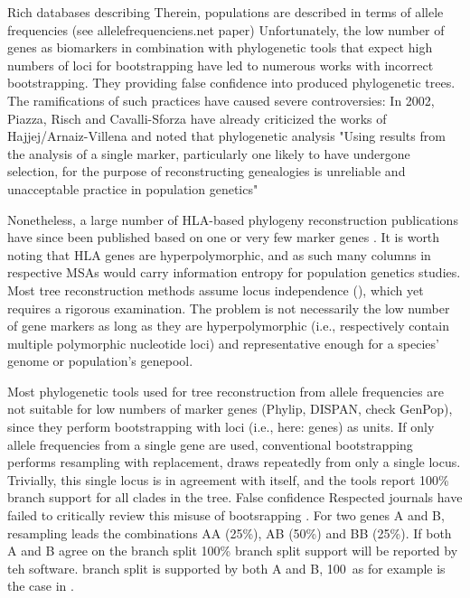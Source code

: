\documentclass{article}
\begin{document}
Rich databases describing
Therein, populations are described in terms of allele frequencies (see allelefrequenciens.net paper)
Unfortunately, the low number of genes as biomarkers in combination with phylogenetic tools that expect high numbers of
loci for bootstrapping have led to numerous works with incorrect bootstrapping.
They providing false confidence into produced phylogenetic trees. The ramifications of such practices have caused
severe controversies:
In 2002, Piazza, Risch and Cavalli-Sforza have already criticized the works of Hajjej/Arnaiz-Villena and noted that
phylogenetic analysis  "Using results from the analysis of a single marker, particularly one likely to
have undergone selection, for the purpose of reconstructing genealogies is unreliable and unacceptable
practice in population genetics"

Nonetheless, a large number of HLA-based phylogeny reconstruction publications have since been  published based on one
or very few marker genes \cite{}.
It is worth noting that HLA genes are hyperpolymorphic, and as such many columns in respective MSAs would carry
information entropy for population genetics studies. Most tree reconstruction methods assume locus independence
(\cite{Efron1996Nov}), which yet requires a rigorous examination. The problem is not necessarily the low number of
gene markers as long as they are hyperpolymorphic (i.e., respectively contain multiple polymorphic nucleotide loci)
and representative enough for a species' genome or population's genepool.

Most phylogenetic tools used for tree reconstruction from allele frequencies are not suitable for low numbers of marker
genes (Phylip, DISPAN, check GenPop), since they perform bootstrapping with loci (i.e., here: genes) as units.
If only allele frequencies from a single gene are used, conventional bootstrapping performs resampling with replacement,
draws repeatedly from only a single locus. Trivially, this single locus is in agreement with itself, and the tools
report 100\% branch support for all clades in the tree.
False confidence
Respected journals have failed to critically review this misuse of bootsrapping \cite{Villena2017Jan,Hajjej2018Mar}.
For two genes A and B, resampling leads the combinations AA (25\%), AB (50\%) and BB (25\%). If both A and B agree on the branch split
100\% branch split support will be reported by teh software. branch split is
supported by both A and B, 100\
as for example is the case in \cite{Hajjej2018Mar}.
\end{document}
